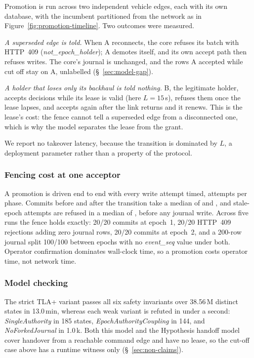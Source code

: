 Promotion is run across two independent vehicle edges, each with its own database, with
the incumbent partitioned from the network as in Figure~\ref{fig:promotion-timeline}. Two
outcomes were measured.

\emph{A superseded edge is told.} When A reconnects, the core refuses its batch with
HTTP~409 (\textit{not\_epoch\_holder}); A demotes itself, and its own accept path then
refuses writes. The core's journal is unchanged, and the rows A accepted while cut off
stay on A, unlabelled (\S~\ref{sec:model-gap}).

\emph{A holder that loses only its backhaul is told nothing.} B, the legitimate holder,
accepts decisions while its lease is valid (here $L=15$\,s), refuses them once the lease
lapses, and accepts again after the link returns and it renews. This is the lease's
cost: the fence cannot tell a superseded edge from a disconnected one, which is why the
model separates the lease from the grant.

We report no takeover latency, because the transition is dominated by $L$, a deployment
parameter rather than a property of the protocol.

\subsubsection{Fencing cost at one acceptor}

A promotion is driven end to end with every write attempt timed,
\promotionNPerPhase{} attempts per phase. Commits before and after the transition take a
median of \promotionMedianA{} and \promotionMedianC{}, and stale-epoch attempts are
refused in a median of \promotionMedianB{}, before any journal write. Across five runs
the fence holds exactly: 20/20 commits at epoch~1, 20/20 HTTP~409 rejections adding zero
journal rows, 20/20 commits at epoch~2, and a 200-row journal split 100/100 between
epochs with no \textit{event\_seq} value under both. Operator confirmation dominates
wall-clock time, so a promotion costs operator time, not network time.

\subsubsection{Model checking}

The strict TLA+ variant passes all six safety invariants over 38.56\,M distinct states
in 13.0\,min, whereas each weak variant is refuted in under a second:
\textit{SingleAuthority} in 185 states, \textit{EpochAuthorityCoupling} in 144, and
\textit{NoForkedJournal} in 1.0\,k. Both this model and the Hypothesis handoff model
cover handover from a reachable command edge and have no lease, so the cut-off case above
has a runtime witness only (\S~\ref{sec:non-claims}).

